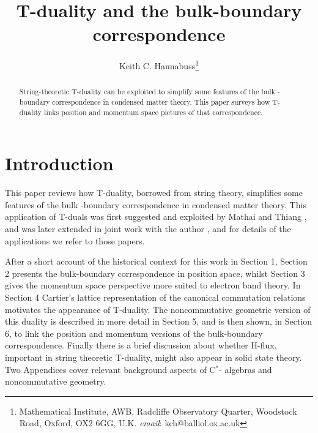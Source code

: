 \documentclass[11pt]{article}
\begin{document}






\title{T-duality and the bulk-boundary correspondence}

\author{Keith C. Hannabuss\footnote{\tiny{Mathematical Institute, 
AWB, Radcliffe Observatory Quarter,
Woodstock Road, 
Oxford, OX2 6GG, U.K.} {\em email}: kch@balliol.ox.ac.uk}
}



\date{}




\maketitle

\begin{abstract}
String-theoretic T-duality can be exploited to simplify some features  of the bulk -boundary correspondence in condensed  matter theory.
This paper surveys how T-duality links position and momentum space pictures of that correspondence.
\end{abstract}






\section*{Introduction}

This paper reviews how T-duality, borrowed from string theory, simplifies some features  of the bulk -boundary correspondence in condensed  matter theory.
This application of T-duals was first suggested and exploited by Mathai and Thiang \cite{MT1,MT3,MT4}, and was later extended  in joint work with the author \cite{HMT16,HMT17}, and for details of the applications we refer to those papers.

After a  short account of the historical context for this work  in Section 1, Section 2 presents the bulk-boundary correspondence in position space, whilst Section 3 gives the momentum space perspective more suited to electron band theory. In Section 4 Cartier's lattice representation of the canonical commutation relations  motivates the appearance of T-duality. The noncommutative geometric version of this duality is described in more detail in Section 5, and is then shown, in Section 6, to link the position and momentum versions of the bulk-boundary correspondence. Finally there is a brief discussion about whether H-flux,  important in string theoretic T-duality, might also appear in solid state theory. Two Appendices cover relevant background aspects of C$^*$- algebras and noncommutative geometry.
\end{document}
